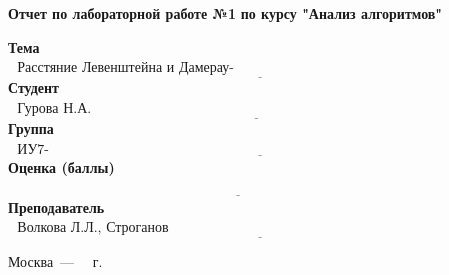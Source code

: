 \begin{titlepage}
	
	\begin{center}
		\Large\textbf{Отчет по лабораторной работе №1}
		\Large\textbf{по курсу "Анализ алгоритмов"}
	\end{center}
	\text{}\newline
	
	\noindent\textbf{Тема} $\underline{\text{~~Расстяние Левенштейна и Дамерау-Левенштейна~~~~~~~~~~~~~~~~~~~~~~~~~~~~~~~~~~~~~~~~~~~}}$\newline\newline\newline
	\noindent\textbf{Студент} $\underline{\text{~~Гурова Н.А.~~~~~~~~~~~~~~~~~~~~~~~~~~~~~~~~~~~~~~~~~~~~~~~~~~~~~~~~~~~~~~~~~~~~~~~~~~~~~~~~~~~~~~~~~}}$\newline\newline
	\noindent\textbf{Группа} $\underline{\text{~~ИУ7-54Б~~~~~~~~~~~~~~~~~~~~~~~~~~~~~~~~~~~~~~~~~~~~~~~~~~~~~~~~~~~~~~~~~~~~~~~~~~~~~~~~~~~~~~~~~~~~~~~~~}}$\newline\newline
	\noindent\textbf{Оценка (баллы)} $\underline{\text{~~~~~~~~~~~~~~~~~~~~~~~~~~~~~~~~~~~~~~~~~~~~~~~~~~~~~~~~~~~~~~~~~~~~~~~~~~~~~~~~~~~~~~~~~~~~~~~~~~~}}$\newline\newline
	\noindent\textbf{Преподаватель} $\underline{\text{~~Волкова Л.Л., Строганов Ю.В.~~~~~~~~~~~~~~~~~~~~~~~~~~~~~~~~~~~~~~~~~~~~~~~~~~~~~~~~~~~~~~~~~~~~~~~~~~~~~~}}$\newline
	
	\begin{center}
		\vfill
		Москва~---~\the\year
		~г.
	\end{center}
	\restoregeometry
\end{titlepage}

